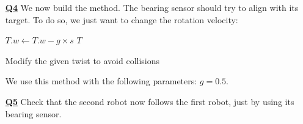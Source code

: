 \documentclass{ecnreport}
\begin{document}
\begin{itemize}
\medskip\item[\textbf{\underline{Q4}}] We now build the  method. The bearing sensor should try to align with its target. To do so, we just want to change the rotation velocity:
\begin{algorithm}[!h]
{}
$T.w \gets T.w - g\times s$\;
\Return $T$
\caption{Modify the given twist to avoid collisions}
\label{algo:bearing}
\end{algorithm}

We use this method with the following parameters: $g = 0.5$.


\medskip\item[\textbf{\underline{Q5}}] Check that the second robot now follows the first robot, just by using its bearing sensor. 

\end{itemize}
\end{document}
